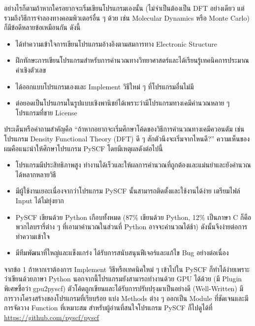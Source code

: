 อย่างไรก็ตามถ้าหากใครอยากจะเริ่มเขียนโปรแกรมเองนั้น (ไม่จำเป็นต้องเป็น DFT อย่างเดียว แต่รวมถึงวิธีการจำลองทางคอมพิวเตอร์อื่น ๆ ด้วย เช่น Molecular Dynamics หรือ Monte Carlo) ก็มีข้อดีหลายข้อเหมือนกัน ดังนี้
%
\begin{itemize}[topsep=0pt]
  \setlength\itemsep{0.5em}
  \item ได้ทำความเข้าใจการเขียนโปรแกรมอ้างอิงตามสมการทาง Electronic Structure

  \item ฝึกทักษะการเขียนโปรแกรมสำหรับการคำนวณทางวิทยาศาสตร์และได้เรียนรู้เทคนิคการประมาณค่าเชิงตัวเลข

  \item ได้ออกแบบโปรแกรมเองและ Implement วิธีใหม่ ๆ ที่โปรแกรมอื่นไม่มี

  \item ต่อยอดเป็นโปรแกรมในรูปแบบเชิงพานิชย์ได้เพราะว่ามีโปรแกรมทางเคมีคำนวณหลาย ๆ โปรแกรมที่ขาย License
\end{itemize}

ประเด็นหรือคำถามสำคัญคือ \enquote{ถ้าหากอยากจะเริ่มศึกษาโค้ดของวิธีการคำนวณทางเคมีควอนตัม เช่น โปรแกรม Density Functional Theory (DFT) ดี ๆ สักตัวนึงจะเริ่มจากไหนดี?} ความเห็นของผมคือแนะนำให้ศึกษาโปรแกรม PySCF โดยมีเหตุผลดังต่อไปนี้
%
\begin{itemize}[topsep=0pt]
  \setlength\itemsep{0.5em}
  \item โปรแกรมมีประสิทธิภาพสูง ทำงานได้เร็วและให้ผลการคำนวณที่ถูกต้องและแม่นยำและยังคำนวณได้หลากหลายวิธี

  \item มีผู้ใช้งานเยอะเนื่องจากว่าโปรแกรม PySCF นั้นสามารถติดตั้งและใช้งานได้ง่าย เตรียมไฟล์ Input ได้ไม่ยุ่งยาก

  \item PySCF เขียนด้วย Python เกือบทั้งหมด (87\% เขียนด้วย Python, 12\% เป็นภาษา C ก็คือพวกไลบรารี่ต่าง ๆ ที่เอามาคำนวณในส่วนที่ Python อาจจะคำนวณได้ช้า) ดังนั้นจึงง่ายต่อการทำความเข้าใจ

  \item มีทีมพัฒนาที่ใหญ่และแข็งแกร่ง ได้รับการสนับสนุนฟีเจอร์และแก้ไข Bug อย่างต่อเนื่อง
\end{itemize}

\noindent จากข้อ 1 ถ้าหากเราต้องการ Implement วิธีหรือเทคนิคใหม่ ๆ เข้าไปใน PySCF ก็ทำได้ง่ายเพราะว่าเขียนด้วยภาษา Python นอกจากนี้โปรแกรมยังสามารถทำงานด้วย GPU ได้ด้วย (มี Plugin พิเศษชื่อว่า gpu2pyscf) ตัวโค้ดถูกเขียนและได้รับการปรับปรุงมาเป็นอย่างดี (Well-Written) มีการวางโครงสร้างของโปรแกรมที่เรียบร้อย แบ่ง Methods ต่าง ๆ ออกเป็น Module ที่ชัดเจนและมีการจัดวาง Function ที่เหมาะสม สำหรับผู้อ่านที่สนใจโปรแกรม PySCF ก็ไปดูได้ที่ \url{https://github.com/pyscf/pyscf}

